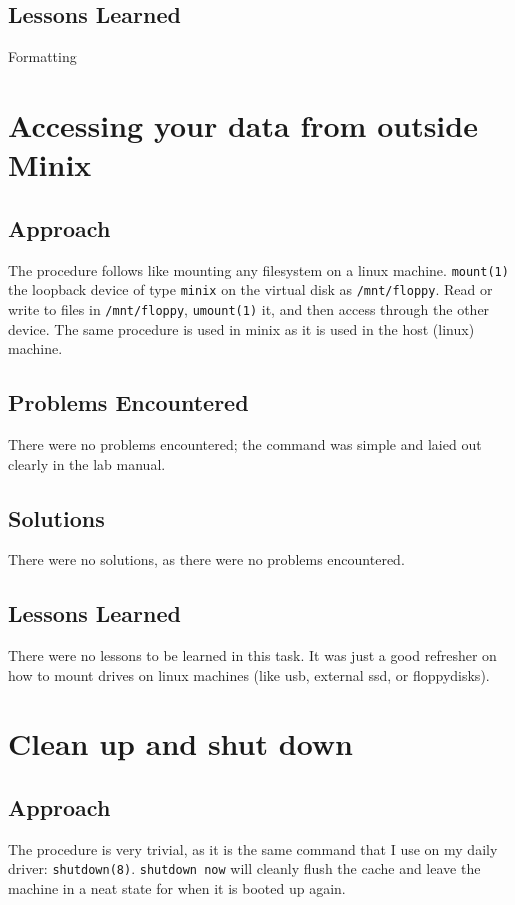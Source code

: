 \documentclass[11pt]{article}
\begin{document}
\subsection{Lessons Learned}
Formatting

\section{Accessing your data from outside {\sc Minix}}
\subsection{Approach}
The procedure follows like mounting any filesystem on a linux machine. {\tt mount(1)} the loopback device of type {\tt minix} on the virtual disk as {\tt /mnt/floppy}. Read or write to files in {\tt /mnt/floppy}, {\tt umount(1)} it, and then access through the other device. The same procedure is used in minix as it is used in the host (linux) machine.

\subsection{Problems Encountered}
There were no problems encountered; the command was simple and laied out clearly in the lab manual.

\subsection{Solutions}
There were no solutions, as there were no problems encountered.

\subsection{Lessons Learned}
There were no lessons to be learned in this task. It was just a good refresher on how to mount drives on linux machines (like usb, external ssd, or floppydisks).

\section{Clean up and shut down}
\subsection{Approach}
The procedure is very trivial, as it is the same command that I use on my daily driver: {\tt shutdown(8)}. {\tt shutdown now} will cleanly flush the cache and leave the machine in a neat state for when it is booted up again.
\end{document}
